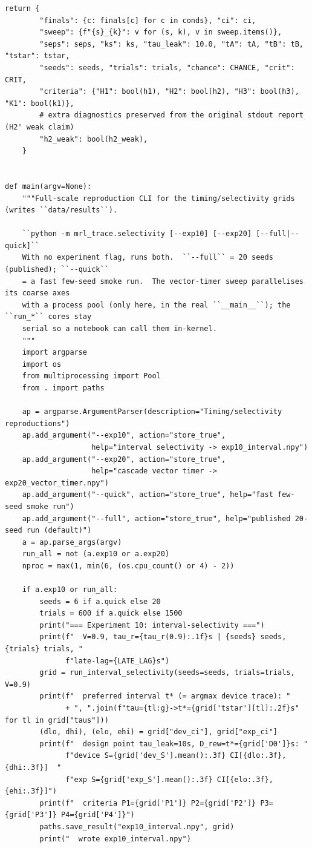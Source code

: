 \begin{lstlisting}[caption={mrl\_trace/selectivity.py},label={lst:siox-src-selectivity}]
    return {
        "finals": {c: finals[c] for c in conds}, "ci": ci,
        "sweep": {f"{s}_{k}": v for (s, k), v in sweep.items()},
        "seps": seps, "ks": ks, "tau_leak": 10.0, "tA": tA, "tB": tB, "tstar": tstar,
        "seeds": seeds, "trials": trials, "chance": CHANCE, "crit": CRIT,
        "criteria": {"H1": bool(h1), "H2": bool(h2), "H3": bool(h3), "K1": bool(k1)},
        # extra diagnostics preserved from the original stdout report (H2' weak claim)
        "h2_weak": bool(h2_weak),
    }


def main(argv=None):
    """Full-scale reproduction CLI for the timing/selectivity grids (writes ``data/results``).

    ``python -m mrl_trace.selectivity [--exp10] [--exp20] [--full|--quick]``
    With no experiment flag, runs both.  ``--full`` = 20 seeds (published); ``--quick``
    = a fast few-seed smoke run.  The vector-timer sweep parallelises its coarse axes
    with a process pool (only here, in the real ``__main__``); the ``run_*`` cores stay
    serial so a notebook can call them in-kernel.
    """
    import argparse
    import os
    from multiprocessing import Pool
    from . import paths

    ap = argparse.ArgumentParser(description="Timing/selectivity reproductions")
    ap.add_argument("--exp10", action="store_true",
                    help="interval selectivity -> exp10_interval.npy")
    ap.add_argument("--exp20", action="store_true",
                    help="cascade vector timer -> exp20_vector_timer.npy")
    ap.add_argument("--quick", action="store_true", help="fast few-seed smoke run")
    ap.add_argument("--full", action="store_true", help="published 20-seed run (default)")
    a = ap.parse_args(argv)
    run_all = not (a.exp10 or a.exp20)
    nproc = max(1, min(6, (os.cpu_count() or 4) - 2))

    if a.exp10 or run_all:
        seeds = 6 if a.quick else 20
        trials = 600 if a.quick else 1500
        print("=== Experiment 10: interval-selectivity ===")
        print(f"  V=0.9, tau_r={tau_r(0.9):.1f}s | {seeds} seeds, {trials} trials, "
              f"late-lag={LATE_LAG}s")
        grid = run_interval_selectivity(seeds=seeds, trials=trials, V=0.9)
        print(f"  preferred interval t* (= argmax device trace): "
              + ", ".join(f"tau={tl:g}->t*={grid['tstar'][tl]:.2f}s" for tl in grid["taus"]))
        (dlo, dhi), (elo, ehi) = grid["dev_ci"], grid["exp_ci"]
        print(f"  design point tau_leak=10s, D_rew=t*={grid['D0']}s: "
              f"device S={grid['dev_S'].mean():.3f} CI[{dlo:.3f},{dhi:.3f}]  "
              f"exp S={grid['exp_S'].mean():.3f} CI[{elo:.3f},{ehi:.3f}]")
        print(f"  criteria P1={grid['P1']} P2={grid['P2']} P3={grid['P3']} P4={grid['P4']}")
        paths.save_result("exp10_interval.npy", grid)
        print("  wrote exp10_interval.npy")


\end{lstlisting}
